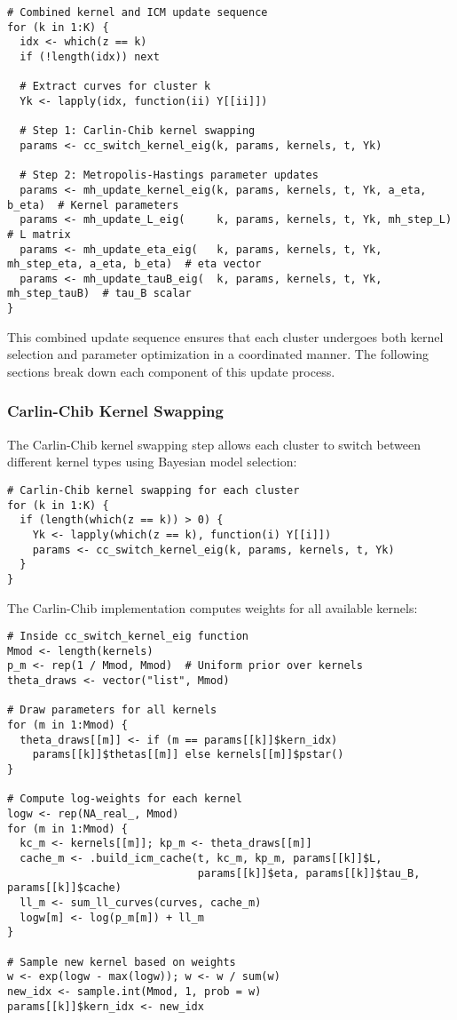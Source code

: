 \documentclass[11pt]{article}
\begin{document}
\begin{lstlisting}
# Combined kernel and ICM update sequence
for (k in 1:K) {
  idx <- which(z == k)
  if (!length(idx)) next
  
  # Extract curves for cluster k
  Yk <- lapply(idx, function(ii) Y[[ii]])
  
  # Step 1: Carlin-Chib kernel swapping
  params <- cc_switch_kernel_eig(k, params, kernels, t, Yk)
  
  # Step 2: Metropolis-Hastings parameter updates
  params <- mh_update_kernel_eig(k, params, kernels, t, Yk, a_eta, b_eta)  # Kernel parameters
  params <- mh_update_L_eig(     k, params, kernels, t, Yk, mh_step_L)      # L matrix
  params <- mh_update_eta_eig(   k, params, kernels, t, Yk, mh_step_eta, a_eta, b_eta)  # eta vector
  params <- mh_update_tauB_eig(  k, params, kernels, t, Yk, mh_step_tauB)  # tau_B scalar
}
\end{lstlisting}

This combined update sequence ensures that each cluster undergoes both kernel selection and parameter optimization in a coordinated manner. The following sections break down each component of this update process.

\subsubsection{Carlin-Chib Kernel Swapping}

The Carlin-Chib kernel swapping step allows each cluster to switch between different kernel types using Bayesian model selection:

\begin{lstlisting}
# Carlin-Chib kernel swapping for each cluster
for (k in 1:K) {
  if (length(which(z == k)) > 0) {
    Yk <- lapply(which(z == k), function(i) Y[[i]])
    params <- cc_switch_kernel_eig(k, params, kernels, t, Yk)
  }
}
\end{lstlisting}

The Carlin-Chib implementation computes weights for all available kernels:

\begin{lstlisting}
# Inside cc_switch_kernel_eig function
Mmod <- length(kernels)
p_m <- rep(1 / Mmod, Mmod)  # Uniform prior over kernels
theta_draws <- vector("list", Mmod)

# Draw parameters for all kernels
for (m in 1:Mmod) {
  theta_draws[[m]] <- if (m == params[[k]]$kern_idx) 
    params[[k]]$thetas[[m]] else kernels[[m]]$pstar()
}

# Compute log-weights for each kernel
logw <- rep(NA_real_, Mmod)
for (m in 1:Mmod) {
  kc_m <- kernels[[m]]; kp_m <- theta_draws[[m]]
  cache_m <- .build_icm_cache(t, kc_m, kp_m, params[[k]]$L, 
                              params[[k]]$eta, params[[k]]$tau_B, params[[k]]$cache)
  ll_m <- sum_ll_curves(curves, cache_m)
  logw[m] <- log(p_m[m]) + ll_m
}

# Sample new kernel based on weights
w <- exp(logw - max(logw)); w <- w / sum(w)
new_idx <- sample.int(Mmod, 1, prob = w)
params[[k]]$kern_idx <- new_idx
\end{lstlisting}
\end{document}
